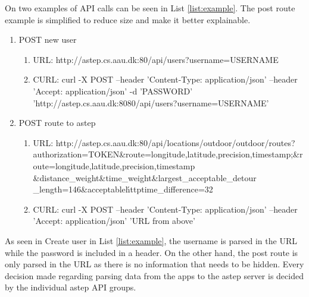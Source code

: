On two examples of API calls can be seen in List \ref{list:example}.
The post route example is simplified to reduce size and make it better explainable.


\begin{enumerate}
\label{list:example}
\item POST new user
\begin{enumerate}
\item URL: http://astep.cs.aau.dk:80/api/users?username=USERNAME
\item CURL: curl -X POST --header 'Content-Type: application/json' --header 'Accept: application/json' -d 'PASSWORD' 'http://astep.cs.aau.dk:8080/api/users?username=USERNAME'
\end{enumerate}
\item POST route to \gls{astep}
\begin{enumerate}
\item URL: http://astep.cs.aau.dk:80/api/locations/outdoor/outdoor/routes?authorization=TOKEN\&route=longitude,latitude,precision,timestamp;\&route=longitude,latitude,precision,timestamp
\&distance\_weight\&time\_weight\&largest\_acceptable\_detour\\
\_length=146\&acceptable\'httptime\_difference=32
\item CURL: curl -X POST --header 'Content-Type: application/json' --header 'Accept: application/json' 'URL from above'
\end{enumerate}
\end{enumerate}

As seen in Create user in List \ref{list:example}, the username is parsed in the URL while the password is included in a header.
On the other hand, the post route is only parsed in the URL as there is no information that needs to be hidden.
Every decision made regarding parsing data from the apps to the \gls{astep} server is decided by the individual \gls{astep} API groups.
